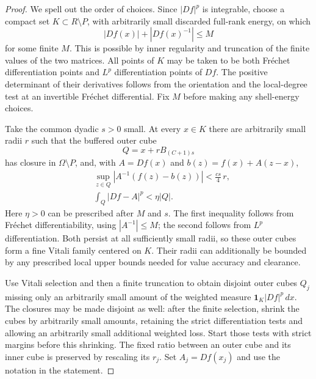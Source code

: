 \documentclass[11pt]{article}
\numberwithin{equation}{section}
\theoremstyle{definition}
\theoremstyle{remark}
\begin{document}
\begin{proof}
We spell out the order of choices.  Since $|Df|^p$ is integrable,
choose a compact set $K\subset R\setminus P$, with arbitrarily
small discarded full-rank energy, on which
\[
 |Df(x)|+|Df(x)^{-1}|\leq M
\]
for some finite $M$.  This is possible by inner regularity and
truncation of the finite values of the two matrices.  All points of
$K$ may be taken to be both Fr\'echet differentiation points and
$L^p$ differentiation points of $Df$.  The positive determinant of
their derivatives follows from the orientation and the local-degree
test at an invertible Fr\'echet differential.  Fix $M$ before making
any shell-energy choices.

Take the common dyadic $s>0$ small.  At every $x\in K$ there are
arbitrarily small radii $r$ such that the buffered outer cube
\[
 Q=x+rB_{(C+1)s}
\]
has closure in $\Omega\setminus P$, and, with $A=Df(x)$ and
$b(z)=f(x)+A(z-x)$,
\begin{align}
 &\sup_{z\in Q}|A^{-1}(f(z)-b(z))|
       <\frac{cs}{4}\,r,\label{hp:jet-value-test}\\
 &\int_Q|Df-A|^p<\eta|Q|.\label{hp:jet-energy-test}
\end{align}
Here $\eta>0$ can be prescribed after $M$ and $s$.
The first inequality follows from Fr\'echet differentiability,
using $|A^{-1}|\leq M$; the second follows from $L^p$
differentiation.  Both persist at all sufficiently small radii, so
these outer cubes form a fine Vitali family centered on $K$.
Their radii can additionally be bounded by any prescribed local
upper bounds needed for value accuracy and clearance.

Use Vitali selection and then a finite truncation to obtain disjoint
outer cubes $Q_j$ missing only an arbitrarily small amount of the
weighted measure $\mathbf1_K|Df|^p\,dx$.  The closures may be made
disjoint as well: after the finite selection, shrink the cubes by
arbitrarily small amounts, retaining the strict differentiation
tests and allowing an arbitrarily small additional weighted loss.
Start those tests with strict margins before this shrinking.  The
fixed ratio between an outer cube and its inner cube is preserved
by rescaling its $r_j$.  Set $A_j=Df(x_j)$ and use the notation in
the statement.


\end{proof}
\end{document}
